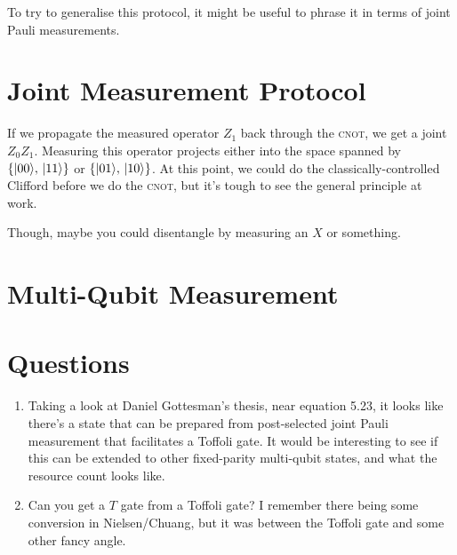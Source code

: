 \documentclass[10pt,a4paper, english]{scrartcl}
\providecommand{\cnot}{\textsc{cnot}}
\begin{document}
To try to generalise this protocol, it might be useful to phrase it in terms of joint Pauli measurements.
\section{Joint Measurement Protocol}
If we propagate the measured operator $Z_1$ back through the \cnot, we get a joint $Z_0Z_1$. 
Measuring this operator projects either into the space spanned by $\left \lbrace {\left\vert{00}\right\rangle},\, {\left\vert{11}\right\rangle} \right \rbrace$ or $\left \lbrace {\left\vert{01}\right\rangle},\, {\left\vert{10}\right\rangle} \right \rbrace$. 
At this point, we could do the classically-controlled Clifford before we do the \cnot, but it's tough to see the general principle at work. 

Though, maybe you could disentangle by measuring an $X$ or something.
\section{Multi-Qubit Measurement}
\section{Questions}
\begin{enumerate}
\item Taking a look at Daniel Gottesman's thesis, near equation 5.23, it looks like there's a state that can be prepared from post-selected joint Pauli measurement that facilitates a Toffoli gate. It would be interesting to see if this can be extended to other fixed-parity multi-qubit states, and what the resource count looks like. 
\item Can you get a $T$ gate from a Toffoli gate? I remember there being some conversion in Nielsen/Chuang, but it was between the Toffoli gate and some other fancy angle. 
\end{enumerate}
\end{document}
